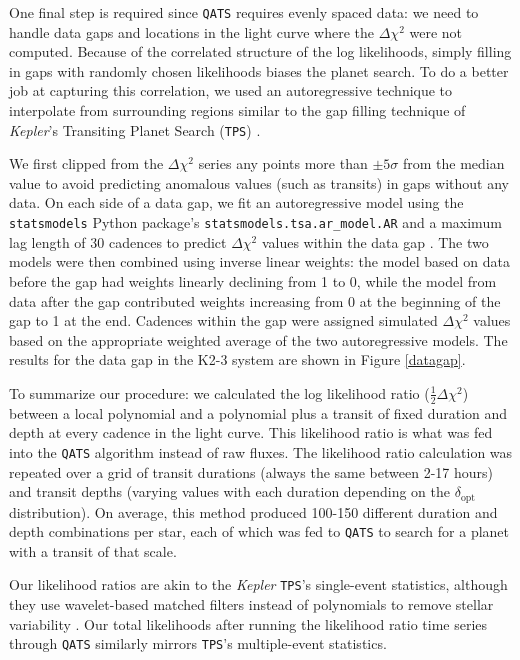 \documentclass[twocolumn]{aastex62}
\newcommand{\project}[1]{\textsl{#1}}
\newcommand{\pipeline}[1]{\texttt{#1}}
\begin{document}
One final step is required since \pipeline{QATS} requires evenly
spaced data: we need to handle data gaps and locations in the light
curve where the $\Delta\chi^2$ were not computed.  Because of the
correlated structure of the log likelihoods, simply filling in gaps
with randomly chosen likelihoods biases the planet search. To do a
better job at capturing this correlation, we used an autoregressive
technique to interpolate from surrounding regions similar to the gap
filling technique of \project{Kepler}'s Transiting Planet Search
(\pipeline{TPS}) \citep{jen10b}.

We first clipped from the $\Delta\chi^2$ series any points more than
$\pm5\sigma$ from the median value to avoid predicting anomalous
values (such as transits) in gaps without any data. On each side of a
data gap, we fit an autoregressive model using the
\pipeline{statsmodels} Python package's
\pipeline{statsmodels.tsa.ar\_model.AR} and a maximum lag length of 30
cadences to predict $\Delta\chi^2$ values within the data gap
\citep{sea10a}. The two models were then combined using inverse linear
weights: the model based on data before the gap had weights linearly
declining from 1 to 0, while the model from data after the gap
contributed weights increasing from 0 at the beginning of the gap to 1
at the end. Cadences within the gap were assigned simulated
$\Delta\chi^2$ values based on the appropriate weighted average of the
two autoregressive models. The results for the data gap in the K2-3
system are shown in Figure \ref{datagap}.

To summarize our procedure: we calculated the log likelihood ratio
($\frac{1}{2}\Delta \chi^2$) between a local polynomial and a
polynomial plus a transit of fixed duration and depth at every cadence
in the light curve. This likelihood ratio is what was fed into the
\pipeline{QATS} algorithm instead of raw fluxes.  The likelihood ratio
calculation was repeated over a grid of transit durations (always the
same between 2-17 hours) and transit depths (varying values with each
duration depending on the $\delta_{\text{opt}}$ distribution). On
average, this method produced 100-150 different duration and depth
combinations per star, each of which was fed to \pipeline{QATS} to
search for a planet with a transit of that scale.

Our likelihood ratios are akin to the \project{Kepler}
\pipeline{TPS}'s single-event statistics, although they use
wavelet-based matched filters instead of polynomials to remove stellar
variability \citep{jen10b, sea13}. Our total likelihoods after running
the likelihood ratio time series through \pipeline {QATS} similarly
mirrors \pipeline{TPS}'s multiple-event statistics.
\end{document}
